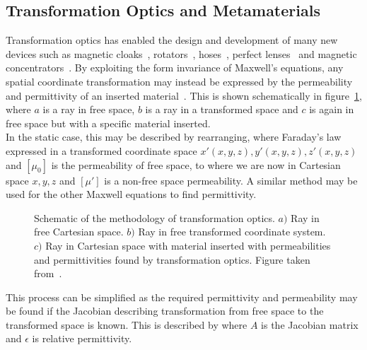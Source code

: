 \documentclass[11pt]{iopart}
\begin{document}
\subsection*{Transformation Optics and Metamaterials}
Transformation optics has enabled the design and development of many
new devices such as magnetic cloaks~\cite{Sun2017}, rotators~\cite{Sun2017}, hoses~\cite{Navau2014}, perfect lenses~\cite{Pendry2000} and
magnetic concentrators~\cite{Navau2012}\cite{N2014}. By exploiting the form invariance of Maxwell's
equations, any spatial coordinate transformation may instead be expressed by
the permeability and permittivity of an inserted material~\cite{Pendry2006}. This is shown schematically in figure~\ref{TO}, where $a$ is a ray in free space, $b$ is a ray in a transformed space and $c$ is again in free space but with a specific material inserted. \\
In the static case, this may be described by rearranging,
where Faraday's law expressed in a
transformed coordinate space $x'(x, y, z), y'(x,
y, z), z'(x, y, z)$ and $[\mu_0]$ is the permeability of free space,
to
where we are now in Cartesian space $x,y,z$
and $[\mu']$ is a non-free space permeability. A similar method may be used for the other Maxwell equations to find permittivity.\\
\begin{figure}[!t] \centering
  \caption{\label{TO} Schematic of the methodology of transformation optics. $a)$ Ray in free Cartesian space. $b)$ Ray in free transformed coordinate system. $c)$ Ray in Cartesian space with material inserted with permeabilities and permittivities found by transformation optics. Figure taken from~\cite{Thesis}.}
  \end{figure}

\noindent This process can be simplified as the required permittivity and permeability may
be found if the Jacobian describing transformation from free space to the transformed space is known. This is described by
where $A$ is the Jacobian matrix and $\epsilon$ is relative permittivity. \\
\end{document}
